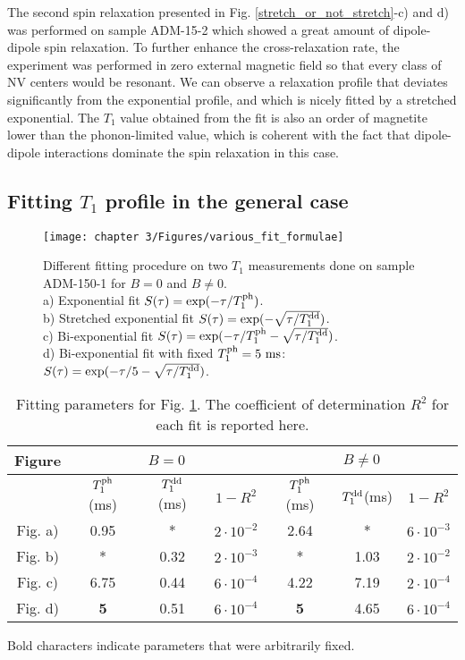 \documentclass[a4paper, 11pt]{report}
\begin{document}
The second spin relaxation presented in Fig. \ref{stretch_or_not_stretch}-c) and d) was performed on sample ADM-15-2 which showed a great amount of dipole-dipole spin relaxation. To further enhance the cross-relaxation rate, the experiment was performed in zero external magnetic field so that every class of NV centers would be resonant. We can observe a relaxation profile that deviates significantly from the exponential profile, and which is nicely fitted by a stretched exponential. The $T_1$ value obtained from the fit is also an order of magnetite lower than the phonon-limited value, which is coherent with the fact that dipole-dipole interactions dominate the spin relaxation in this case.

\subsection{Fitting $T_1$ profile in the general case}

\begin{figure}[h]
\centering
\texttt{[image: chapter 3/Figures/various\_fit\_formulae]}
\caption{Different fitting procedure on two $T_1$ measurements done on sample ADM-150-1 for $B=0$ and $B\neq0$. \\ a) Exponential fit $S(\tau)=\exp (-\tau/T_1^{\rm ph})$. \\ b) Stretched exponential fit $S(\tau)=\exp (-\sqrt{\tau/T_1^{\rm dd}})$. \\ c) Bi-exponential fit $S(\tau)=\exp (-\tau/T_1^{\rm ph} -\sqrt{\tau/T_1^{\rm dd}})$. \\ d) Bi-exponential fit with fixed $T_1^{\rm ph}=5\ \rm ms$: $S(\tau)=\exp (-\tau/5 -\sqrt{\tau/T_1^{\rm dd}})$.}
\label{various_fit_formulae}
\end{figure}

\begin{table}[htbp]
\centering
\caption{Fitting parameters for Fig.
 \ref{various_fit_formulae}. The coefficient of determination $R^2$ for each fit is reported here.}
 \label{fitting table}
\begin{tabular}{c|ccc|ccc}
\toprule
Figure & \multicolumn{3}{c}{$B=0$} & \multicolumn{3}{c}{$B\neq0$}\\
\midrule
{} & $T_1^{\rm ph}$ (ms)& $T_1^{\rm dd}$ (ms) & $1-R^2$ & $T_1^{\rm ph}$ (ms)& $T_1^{\rm dd}$(ms)& $1-R^2$\\
\midrule
Fig. a) & 0.95 & * & $2\cdot 10^{-2}$ & 2.64 & * & $6\cdot 10^{-3}$ \\
Fig. b) & * & 0.32 & $2\cdot 10^{-3}$& * & 1.03 & $2\cdot 10^{-2}$ \\
Fig. c) & 6.75 & 0.44 & $6\cdot 10^{-4}$ & 4.22 & 7.19 & $2\cdot 10^{-4}$\\
Fig. d) & \textbf{5} & 0.51 & $6\cdot 10^{-4}$ & \textbf{5} & 4.65 & $6\cdot 10^{-4}$\\
\bottomrule
\end{tabular}

Bold characters indicate parameters that were arbitrarily fixed.
\end{table}
\end{document}
